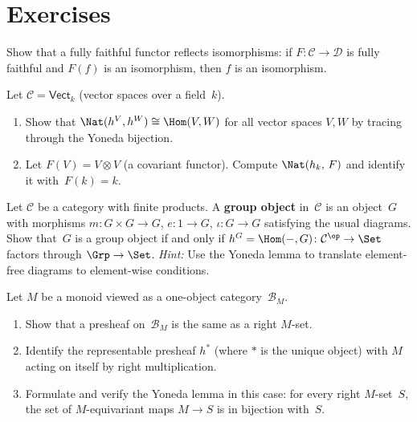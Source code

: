 \section{Exercises}\label{sec:yoneda-exercises}

\begin{exercise}\label{exer:ff-reflects-iso}
Show that a fully faithful functor reflects isomorphisms: if
$F\colon\mathcal{C}\to\mathcal{D}$ is fully faithful and $F(f)$
is an isomorphism, then $f$ is an isomorphism.
\end{exercise}

\begin{exercise}\label{exer:yoneda-explicit}
Let $\mathcal{C} = \mathsf{Vect}_k$ (vector spaces over a field~$k$).
\begin{enumerate}[label=(\alph*)]
\item Show that $\Nat(h^V,h^W)\cong\Hom(V,W)$ for all vector
    spaces $V,W$ by tracing through the Yoneda bijection.
\item Let $F(V) = V\otimes V$ (a covariant functor).  Compute
    $\Nat(h_k,\,F)$ and identify it with~$F(k) = k$.
\end{enumerate}
\end{exercise}

\begin{exercise}\label{exer:group-as-presheaf}
Let $\mathcal{C}$ be a category with finite products.  A \textbf{group
object} in~$\mathcal{C}$ is an object~$G$ with morphisms
$m\colon G\times G\to G$, $e\colon 1\to G$, $\iota\colon G\to G$
satisfying the usual diagrams.  Show that~$G$ is a group object if and
only if $h^G = \Hom(-,G)\colon\mathcal{C}^{\op}\to\Set$ factors through
$\Grp\to\Set$.
\emph{Hint:} Use the Yoneda lemma to translate element-free diagrams
to element-wise conditions.
\end{exercise}

\begin{exercise}\label{exer:yoneda-monoid}
Let $M$ be a monoid viewed as a one-object category~$\mathcal{B}_M$.
\begin{enumerate}[label=(\alph*)]
\item Show that a presheaf on~$\mathcal{B}_M$ is the same as a
    right $M$-set.
\item Identify the representable presheaf $h^{*}$ (where $*$ is
    the unique object) with $M$ acting on itself by right multiplication.
\item Formulate and verify the Yoneda lemma in this case: for every
    right $M$-set~$S$, the set of $M$-equivariant maps $M\to S$
    is in bijection with~$S$.
\end{enumerate}
\end{exercise}

